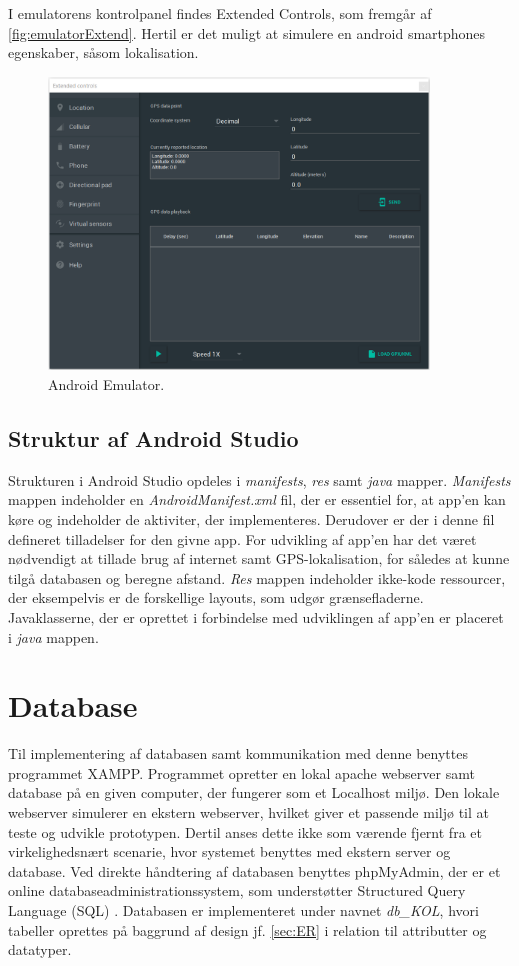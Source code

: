 \noindent
I emulatorens kontrolpanel findes Extended Controls, som fremgår af \autoref{fig:emulatorExtend}. Hertil er det muligt at simulere en android smartphones egenskaber, såsom lokalisation.

\begin{figure} [H]
\centering
\includegraphics[width=0.9\textwidth]{figures/emulatorExtend}
\caption{Android Emulator.}
\label{fig:emulatorExtend}
\end{figure}

\subsection*{Struktur af Android Studio}
Strukturen i Android Studio opdeles i \textit{manifests}, \textit{res} samt \textit{java} mapper. \textit{Manifests} mappen indeholder en \textit{AndroidManifest.xml} fil, der er essentiel for, at app'en kan køre og indeholder de aktiviter, der implementeres. Derudover er der i denne fil defineret tilladelser for den givne app. For udvikling af app'en har det været nødvendigt at tillade brug af internet samt GPS-lokalisation, for således at kunne tilgå databasen og beregne afstand. 
\textit{Res} mappen indeholder ikke-kode ressourcer, der eksempelvis er de forskellige layouts, som udgør grænsefladerne.
Javaklasserne, der er oprettet i forbindelse med udviklingen af app'en er placeret i \textit{java} mappen.\cite{android2017}
 
\section{Database}
Til implementering af databasen samt kommunikation med denne benyttes programmet XAMPP. Programmet opretter en lokal apache webserver samt database på en given computer, der fungerer som et Localhost miljø. Den lokale webserver simulerer en ekstern webserver, hvilket giver et passende miljø til at teste og udvikle prototypen. Dertil anses dette ikke som værende fjernt fra et virkelighedsnært scenarie, hvor systemet benyttes med ekstern server og database.
Ved direkte håndtering af databasen benyttes phpMyAdmin, der er et online databaseadministrationssystem, som understøtter Structured Query Language (SQL) \cite{silbershatz2011}. 
Databasen er implementeret under navnet \textit{db\_KOL}, hvori tabeller oprettes på baggrund af design jf. \autoref{sec:ER} i relation til attributter og datatyper.

